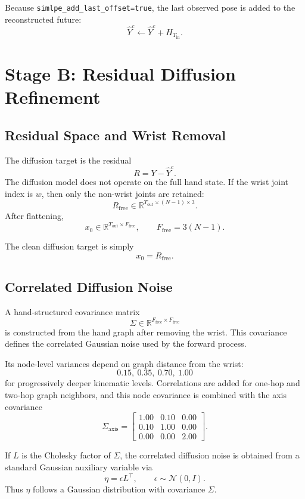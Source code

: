 \documentclass[11pt]{article}
\begin{document}
Because \texttt{simlpe\_add\_last\_offset=true}, the last observed pose is added to the reconstructed future:
\[
\hat{Y}^{c} \leftarrow \hat{Y}^{c} + H_{T_{\mathrm{in}}}.
\]

\section{Stage B: Residual Diffusion Refinement}

\subsection{Residual Space and Wrist Removal}

The diffusion target is the residual
\[
R = Y - \hat{Y}^{c}.
\]
The diffusion model does not operate on the full hand state. If the wrist joint index is $w$, then only the non-wrist joints are retained:
\[
R_{\mathrm{free}} \in \mathbb{R}^{T_{\mathrm{out}} \times (N-1) \times 3}.
\]
After flattening,
\[
x_0 \in \mathbb{R}^{T_{\mathrm{out}} \times F_{\mathrm{free}}},
\qquad
F_{\mathrm{free}} = 3(N-1).
\]

The clean diffusion target is simply
\[
x_0 = R_{\mathrm{free}}.
\]

\subsection{Correlated Diffusion Noise}

A hand-structured covariance matrix
\[
\Sigma \in \mathbb{R}^{F_{\mathrm{free}} \times F_{\mathrm{free}}}
\]
is constructed from the hand graph after removing the wrist. This covariance defines the correlated Gaussian noise used by the forward process.

Its node-level variances depend on graph distance from the wrist:
\[
0.15,\ 0.35,\ 0.70,\ 1.00
\]
for progressively deeper kinematic levels. Correlations are added for one-hop and two-hop graph neighbors, and this node covariance is combined with the axis covariance
\[
\Sigma_{\mathrm{axis}} =
\begin{bmatrix}
1.00 & 0.10 & 0.00 \\
0.10 & 1.00 & 0.00 \\
0.00 & 0.00 & 2.00
\end{bmatrix}.
\]

If $L$ is the Cholesky factor of $\Sigma$, the correlated diffusion noise is obtained from a standard Gaussian auxiliary variable via
\[
\eta = \epsilon L^\top,
\qquad
\epsilon \sim \mathcal{N}(0,I).
\]
Thus $\eta$ follows a Gaussian distribution with covariance $\Sigma$.
\end{document}
